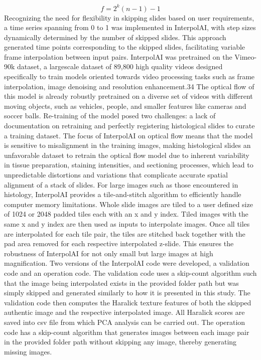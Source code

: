 \begin{refsection}
\begin{equation}
    \label{chapter_6_eq1}
        f = 2^k (n - 1) - 1 \tag{Eq.~1}
    \end{equation}
    Recognizing the need for flexibility in skipping slides based on user requirements, a time series spanning from 0 to 1 was implemented in InterpolAI, with step sizes dynamically determined by the number of skipped slides. This approach generated time points corresponding to the skipped slides, facilitating variable frame interpolation between input pairs.
    InterpolAI was pretrained on the Vimeo-90k dataset, a largescale dataset of 89,800 high quality videos designed specifically to train models oriented towards video processing tasks such as frame interpolation, image denoising and resolution enhancement.34 The optical flow of this model is already robustly pretrained on a diverse set of videos with different moving objects, such as vehicles, people, and smaller features like cameras and soccer balls. Re-training of the model posed two challenges: a lack of documentation on retraining and perfectly registering histological slides to curate a training dataset. The focus of InterpolAI on optical flow means that the model is sensitive to misalignment in the training images, making histological slides an unfavorable dataset to retrain the optical flow model due to inherent variability in tissue preparation, staining intensities, and sectioning processes, which lead to unpredictable distortions and variations that complicate accurate spatial alignment of a stack of slides. 
    For large images such as those encountered in histology, InterpolAI provides a tile-and-stitch algorithm to efficiently handle computer memory limitations. Whole slide images are tiled to a user defined size of 1024 or 2048 padded tiles each with an x and y index. Tiled images with the same x and y index are then used as inputs to interpolate images. Once all tiles are interpolated for each tile pair, the tiles are stitched back together with the pad area removed for each respective interpolated z-slide. This ensures the robustness of InterpolAI for not only small but large images at high magnification.  
    Two versions of the InterpolAI code were developed, a validation code and an operation code. The validation code uses a skip-count algorithm such that the image being interpolated exists in the provided folder path but was simply skipped and generated similarly to how it is presented in this study. The validation code then computes the Haralick texture features of both the skipped authentic image and the respective interpolated image. All Haralick scores are saved into csv file from which PCA analysis can be carried out. The operation code has a skip-count algorithm that generates images between each image pair in the provided folder path without skipping any image, thereby generating missing images. 
    

\end{refsection}
